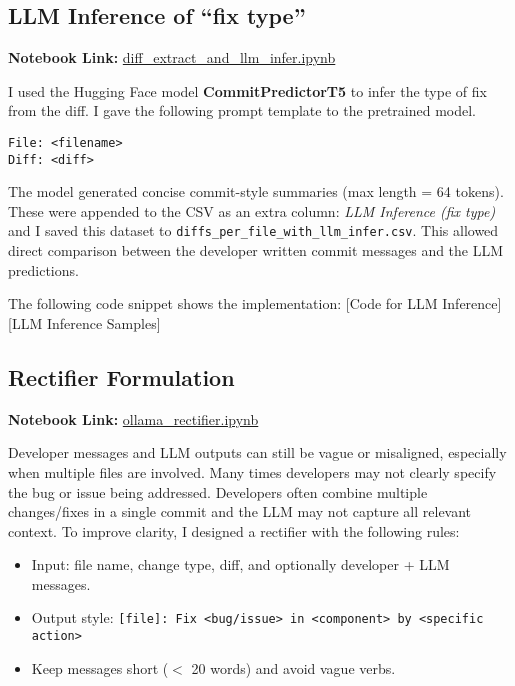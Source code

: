 \documentclass[10pt,a4paper]{report}
\begin{document}
\subsection{LLM Inference of ``fix type''}
\textbf{Notebook Link:} \href{https://github.com/ShardulJunagade/cs202-stt/blob/main/lab2/diff_extract_and_llm_infer.ipynb}{diff\_extract\_and\_llm\_infer.ipynb}

I used the Hugging Face model \textbf{CommitPredictorT5} to infer the type of fix from the diff. I gave the following prompt template to the pretrained model.
\begin{verbatim}
File: <filename>
Diff: <diff>
\end{verbatim}
The model generated concise commit-style summaries (max length = 64 tokens). These were appended to the CSV as an extra column: \textit{LLM Inference (fix type)} and I saved this dataset to \texttt{diffs\_per\_file\_with\_llm\_infer.csv}. This allowed direct comparison between the developer written commit messages and the LLM predictions.

The following code snippet shows the implementation:
[Code for LLM Inference]
[LLM Inference Samples]

\subsection{Rectifier Formulation}
\textbf{Notebook Link:} \href{https://github.com/ShardulJunagade/cs202-stt/blob/main/lab2/ollama_rectifier.ipynb}{ollama\_rectifier.ipynb}

Developer messages and LLM outputs can still be vague or misaligned, especially when multiple files are involved. Many times developers may not clearly specify the bug or issue being addressed. Developers often combine multiple changes/fixes in a single commit and the LLM may not capture all relevant context. To improve clarity, I designed a rectifier with the following rules:
\begin{itemize}[itemsep=0.05em, topsep=0pt]
    \item Input: file name, change type, diff, and optionally developer + LLM messages.
    \item Output style: \texttt{[file]: Fix <bug/issue> in <component> by <specific action>}
    \item Keep messages short ($<$ 20 words) and avoid vague verbs.
\end{itemize}
\end{document}
